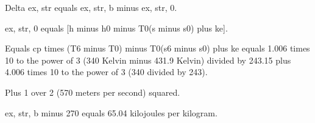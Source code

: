 Delta ex, str equals ex, str, b minus ex, str, 0.

ex, str, 0 equals [h minus h0 minus T0(s minus s0) plus ke].

Equals cp times (T6 minus T0) minus T0(s6 minus s0) plus ke equals 1.006 times 10 to the power of 3 (340 Kelvin minus 431.9 Kelvin) divided by 243.15 plus 4.006 times 10 to the power of 3 (340 divided by 243).

Plus 1 over 2 (570 meters per second) squared.

ex, str, b minus 270 equals 65.04 kilojoules per kilogram.